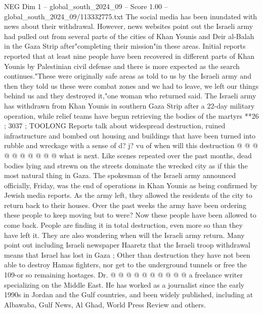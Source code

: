 \begin{textsample}{NEG Dim 1 – global\_south\_2024\_09 – Score 1.00 – global\_south\_2024\_09/113332775.txt}  \label{ex:f1_neg_421}
The social media has been inundated with news about their withdrawal.
However, news websites point out the Israeli army had pulled out from several parts of the cities of Khan Younis and Deir al-Balah in the Gaza Strip after"completing their mission"in these areas.
Initial reports reported that at least nine people have been recovered in different parts of Khan Younis by Palestinian civil defense and there is more expected as the search continues."These were originally safe areas as told to us by the Israeli army and then they told us these were combat zones and we had to leave, we left our things behind us and they destroyed it,"one woman who returned said.
The Israeli army has withdrawn from Khan Younis in southern Gaza Strip after a 22-day military operation, while relief teams have begun retrieving the bodies of the martyrs **26 ; 3037 ; TOOLONG Reports talk about widespread destruction, ruined infrastructure and bombed out housing and buildings that have been turned into rubble and wreckage with a sense of d? j? vu of when will this destruction @ @ @ @ @ @ @ @ @ @ what is next.
Like scenes repeated over the past months, dead bodies lying and strewn on the streets dominate the wrecked city as if this the most natural thing in Gaza.
The spokesman of the Israeli army announced officially, Friday, was the end of operations in Khan Younis as being confirmed by Jewish media reports.
As the army left, they allowed the residents of the city to return back to their houses.
Over the past weeks the army have been ordering these people to keep moving but to were?
Now these people have been allowed to come back.
People are finding it in total destruction, even more so than they have left it.
They are also wondering when will the Israeli army return.
Many point out including Israeli newspaper Haaretz that the Israeli troop withdrawal means that Israel has lost in Gaza ; Other than destruction they have not been able to destroy Hamas fighters, nor get to the underground tunnels or free the 109-or so remaining hostages.
Dr. @ @ @ @ @ @ @ @ @ @ a freelance writer specializing on the Middle East.
He has worked as a journalist since the early 1990s in Jordan and the Gulf countries, and been widely published, including at Albawaba, Gulf News, Al Ghad, World Press Review and others.

\end{textsample}
